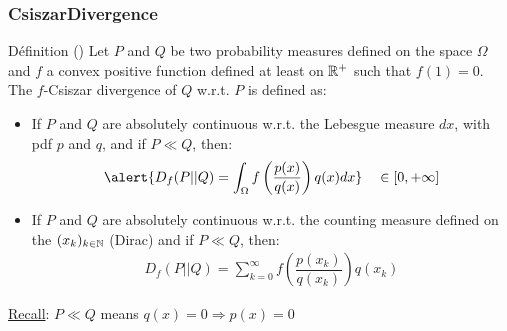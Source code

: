 \documentclass[8pt]{beamer}
\begin{document}
\begin{frame}
  \frametitle{CsiszarDivergence}
\small
  \begin{block}{D\'efinition}
(\cite{Csiszar1963})
    Let $P$ and $Q$ be two probability measures defined on the space $\Omega$ and  $f$ a  convex positive function defined at least on ${\mathbb R}^+$ such that $f(1)=0$.\\
    The $f$-Csiszar divergence of $Q$ w.r.t. $P$ is defined as:
    \begin{itemize}
     \item If $P$ and $Q$ are absolutely continuous w.r.t. the Lebesgue measure $dx$, with pdf $p$ and $q$, and if $P  \ll Q$, then: 
    \begin{align}
     \alert{ D_f(P||Q)=\int_{\Omega}f\left(\dfrac{p(x)}{q(x)}\right)q(x)dx} \quad \in[0,+\infty]
    \end{align}
    \item If $P$ and $Q$ are absolutely continuous w.r.t. the counting measure defined on the $(x_k)_{k \in {\mathbb N}}$ (Dirac) and if $P  \ll Q$, then:
    \begin{align}
     \displaystyle D_f(P||Q)=\sum_{k=0}^{\infty}f\left(\dfrac{p(x_k)}{q(x_k)}\right)q(x_k)     
    \end{align}

    \end{itemize}
    
    
    \end{block}
    \underline{Recall}: $P  \ll Q$ means $q(x)= 0 \Longrightarrow p(x)=0$
\end{frame}
\end{document}
